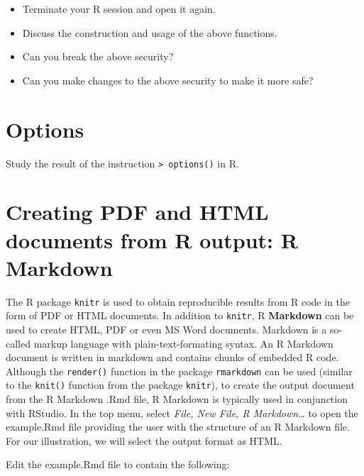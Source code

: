 \documentclass[
]{book}
\providecommand{\tightlist}{%
  \setlength{\itemsep}{0pt}\setlength{\parskip}{0pt}}
\begin{document}
\begin{itemize}
\tightlist
\item
  Terminate your R session and open it again.
\item
  Discuss the construction and usage of the above functions.
\item
  Can you break the above security?
\item
  Can you make changes to the above security to make it more safe?
\end{itemize}

\section{Options}\label{options}

Study the result of the instruction \texttt{\textgreater{}\ options()} in R.

\section{Creating PDF and HTML documents from R output: R Markdown}\label{creating-pdf-and-html-documents-from-r-output-r-markdown}

The R package \texttt{knitr} is used to obtain reproducible results from R code in the form of PDF or HTML documents. In addition to \texttt{knitr}, R \textbf{{Markdown}} can be used to create HTML, PDF or even MS Word documents. Markdown is a so-called markup language with plain-text-formating syntax. An R Markdown document is written in markdown and contains chunks of embedded R code. Although the \texttt{render()} function in the package \texttt{rmarkdown} can be used (similar to the \texttt{knit()} function from the package \texttt{knitr}), to create the output document from the R Markdown {.Rmd} file, R Markdown is typically used in conjunction with {RStudio}. In the top menu, select \emph{File, New File, R Markdown\ldots{}} to open the {example.Rmd} file providing the user with the structure of an R Markdown file. For our illustration, we will select the output format as HTML.

Edit the {example.Rmd} file to contain the following:
\end{document}
